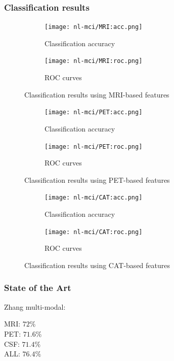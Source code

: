 \documentclass[12pt,a4paper]{article}
\begin{document}
\subsubsection{Classification results}
\label{sec:nl-mci-res}

\begin{figure}[H]
  \centering
  \begin{subfigure}[h]{0.49\textwidth}
    \texttt{[image: nl-mci/MRI:acc.png]}
    \caption{Classification accuracy}  
  \end{subfigure}
  \begin{subfigure}[h]{0.49\textwidth}
    \texttt{[image: nl-mci/MRI:roc.png]}
    \caption{ROC curves}  
  \end{subfigure}
  \caption{Classification results using MRI-based features}
\end{figure}

\begin{figure}[H]
  \centering
  \begin{subfigure}[h]{0.49\textwidth}
    \texttt{[image: nl-mci/PET:acc.png]}
    \caption{Classification accuracy}  
  \end{subfigure}
  \begin{subfigure}[h]{0.49\textwidth}
    \texttt{[image: nl-mci/PET:roc.png]}
    \caption{ROC curves}  
  \end{subfigure}
  \caption{Classification results using PET-based features}
\end{figure}

\begin{figure}[H]
  \centering
  \begin{subfigure}[h]{0.49\textwidth}
    \texttt{[image: nl-mci/CAT:acc.png]}
    \caption{Classification accuracy}  
  \end{subfigure}
  \begin{subfigure}[h]{0.49\textwidth}
    \texttt{[image: nl-mci/CAT:roc.png]}
    \caption{ROC curves}  
  \end{subfigure}
  \caption{Classification results using CAT-based features}
\end{figure}

\subsubsection{State of the Art}
\label{sec:nl-mci-soa}

Zhang multi-modal:

MRI: $72\%$\\
PET: $71.6\%$\\
CSF: $71.4\%$\\
ALL: $76.4\%$\\
\end{document}
